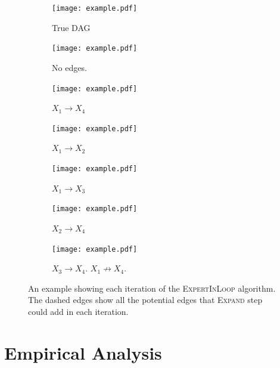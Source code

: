 \documentclass{uai2025} %
\begin{document}
\begin{figure}[t!]
	\begin{subfigure}{0.125 \textwidth}
		\centering
		\texttt{[image: example.pdf]}
		\caption{True DAG}
	\end{subfigure}%
	\begin{subfigure}{0.125 \textwidth}
		\centering
		\texttt{[image: example.pdf]}
		\caption{No edges.}
	\end{subfigure}%
	\begin{subfigure}{0.125 \textwidth}
		\centering
		\texttt{[image: example.pdf]}
		\caption{$ X_1 \rightarrow X_4 $}
	\end{subfigure}%
	\begin{subfigure}{0.125 \textwidth}
		\centering
		\texttt{[image: example.pdf]}
		\caption{$ X_1 \rightarrow X_2 $}
	\end{subfigure}
	\begin{subfigure}{0.125 \textwidth}
		\centering
		\texttt{[image: example.pdf]}
		\caption{$ X_1 \rightarrow X_3 $}
	\end{subfigure}%
	\begin{subfigure}{0.125 \textwidth}
		\centering
		\texttt{[image: example.pdf]}
		\caption{$ X_2 \rightarrow X_4 $}
	\end{subfigure}%
	\begin{subfigure}{0.250 \textwidth}
		\centering
		\texttt{[image: example.pdf]}
		\caption{$ X_3 \rightarrow X_4 $. $ X_1 \not \rightarrow X_4 $.}
	\end{subfigure}
	\caption{An example showing each iteration of the \textsc{ExpertInLoop} algorithm. The dashed edges show all the potential edges that \textsc{Expand} step could add in each iteration.}
\end{figure}




\section{Empirical Analysis}
\label{sec:empirical}
\end{document}
